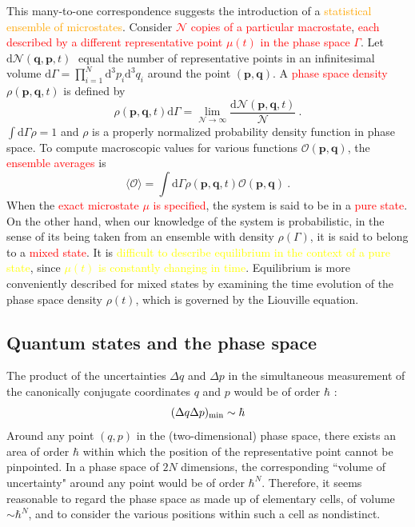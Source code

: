 \documentclass[12pt,a4paper]{article}
\renewcommand{\vec}[1]{\boldsymbol{#1}}
\newcommand{\dif}{\mathrm{d}}
\begin{document}
This many-to-one correspondence suggests the introduction of a \textcolor{orange}{statistical ensemble of microstates}. Consider \textcolor{red}{$\mathcal N$ copies of a particular macrostate}, \textcolor{red}{each described by a different representative point $\mu(t)$ in the phase space $\Gamma$}. Let $\dif \mathcal N(\vec{q}, \vec{p}, t)$􏱑 equal the number of representative points in an infinitesimal volume $\dif \Gamma = \prod_{i=1}^N \dif^3 p_i \dif^3 q_i$ around the point $(\vec{p}, \vec{q})$. A \textcolor{red}{phase space density} $\rho(\vec{p}, \vec{q}, t)$ is defined by
\begin{equation}
\rho(\vec{p}, \vec{q}, t) \dif \Gamma = \lim_{\mathcal N \rightarrow \infty} \dfrac{\dif \mathcal N(\vec{p}, \vec{q}, t)}{\mathcal N} ~.
\end{equation}
$\int \dif \Gamma \rho = 1$ and $\rho$ is a properly normalized probability density function in phase space. To compute macroscopic values for various functions $\mathcal O(\vec{p}, \vec{q})$, the \textcolor{red}{ensemble averages} is
\begin{equation}
\langle \mathcal O \rangle = \int \dif \Gamma  \rho(\vec{p}, \vec{q}, t) \mathcal O(\vec{p}, \vec{q}) ~.
\end{equation}
When the \textcolor{red}{exact microstate $\mu$ is specified}, the system is said to be in a \textcolor{red}{pure state}. On the other hand, when our knowledge of the system is probabilistic, in the sense of its being taken from an ensemble with density $\rho(\Gamma)$, it is said to belong to a \textcolor{red}{mixed state}. It is \textcolor{yellow}{difficult to describe equilibrium in the context of a pure state}, since \textcolor{yellow}{$\mu(t)$ is constantly changing in time}. Equilibrium is more conveniently described for mixed states by examining the time evolution of the phase space density $\rho(t)$, which is governed by the Liouville equation. 












\subsection{Quantum states and the phase space}
\cite{pathria1996statistical} The product of the uncertainties $\Delta q$ and $\Delta p$ in the simultaneous measurement of the canonically conjugate coordinates $q$ and $p$ would be of order $\hbar$ :
\begin{equation}
(\Delta q \Delta p)_{\rm min} \sim \hbar
\end{equation}
Around any point $(q, p)$ in the (two-dimensional) phase space, there exists an area of order $\hbar$ within which the position of the representative point cannot be pinpointed. In a phase space of $2N$ dimensions, the corresponding ``volume of uncertainty" around any point would be of order $\hbar^N$. Therefore, it seems reasonable to regard the phase space as made up of elementary cells, of volume $\sim \hbar^N$, and to consider the various positions within such a cell as nondistinct. 
\end{document}
